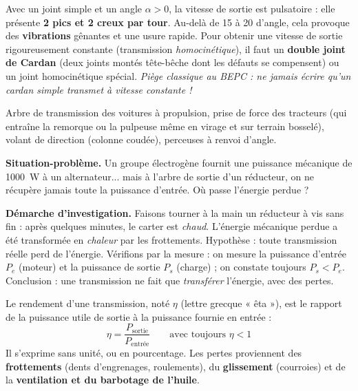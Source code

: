 \documentclass[11pt]{article}
\newcommand{\cle}[1]{{\popxbold\color{popdark}#1}}
\newcounter{popsec}
\newcounter{popsub}
\newcommand{\courssub}[1]{%
  \stepcounter{popsub}%
  \par\vspace{9pt}\noindent{\popxbold\fontsize{11.5}{13}\selectfont\color{popink}{\color{poporange}\thepopsec.\thepopsub}\hspace{6pt}#1}\par\nopagebreak\vspace{4pt}
}
\begin{document}
\begin{attention}
Avec un joint simple et un angle $\alpha > 0$, la vitesse de sortie est \cle{pulsatoire} : elle présente \textbf{2 pics et 2 creux par tour}. Au-delà de 15\textdegree{} à 20\textdegree{} d'angle, cela provoque des \textbf{vibrations} gênantes et une usure rapide. Pour obtenir une vitesse de sortie rigoureusement constante (transmission \emph{homocinétique}), il faut un \textbf{double joint de Cardan} (deux joints montés tête-bêche dont les défauts se compensent) ou un joint homocinétique spécial. \emph{Piège classique au BEPC : ne jamais écrire qu'un cardan simple transmet à vitesse constante !}
\end{attention}

\begin{exemplebox}
Arbre de transmission des voitures à propulsion, prise de force des tracteurs (qui entraîne la remorque ou la pulpeuse même en virage et sur terrain bosselé), volant de direction (colonne coudée), perceuses à renvoi d'angle.
\end{exemplebox}

\courssub{Le rendement d'une transmission}

\textbf{Situation-problème.} Un groupe électrogène fournit une puissance mécanique de \SI{1000}{W} à un alternateur... mais à l'arbre de sortie d'un réducteur, on ne récupère jamais toute la puissance d'entrée. Où passe l'énergie perdue ?

\textbf{Démarche d'investigation.} Faisons tourner à la main un réducteur à vis sans fin : après quelques minutes, le carter est \emph{chaud}. L'énergie mécanique perdue a été transformée en \emph{chaleur} par les frottements. Hypothèse : toute transmission réelle perd de l'énergie. Vérifions par la mesure : on mesure la puissance d'entrée $P_e$ (moteur) et la puissance de sortie $P_s$ (charge) ; on constate toujours $P_s < P_e$. Conclusion : une transmission ne fait que \emph{transférer} l'énergie, avec des pertes.

\begin{definition}[Rendement]
Le \cle{rendement} d'une transmission, noté $\eta$ (lettre grecque « êta »), est le rapport de la puissance utile de sortie à la puissance fournie en entrée :
\[ \eta = \frac{P_{\text{sortie}}}{P_{\text{entrée}}} \qquad \text{avec toujours } \eta < 1 \]
Il s'exprime sans unité, ou en pourcentage. Les pertes proviennent des \textbf{frottements} (dents d'engrenages, roulements), du \textbf{glissement} (courroies) et de la \textbf{ventilation et du barbotage de l'huile}.
\end{definition}
\end{document}
